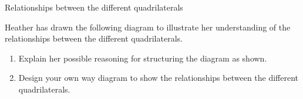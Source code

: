 \begin{Investigation}{Relationships between the different quadrilaterals}


Heather has drawn the following diagram to illustrate her understanding of the relationships between the different quadrilaterals.



 \begin{enumerate}[itemsep=2pt, label=\textbf{\arabic*}.]
\item Explain her possible reasoning for structuring the diagram as shown.
\item Design your own way diagram to show the relationships between the different quadrilaterals.
 \end{enumerate}
\end{Investigation}



